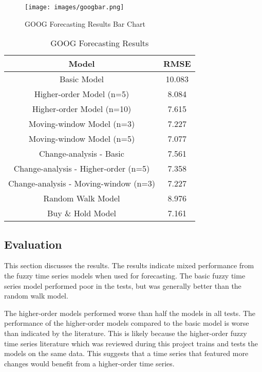 \documentclass[12pt, oneside, a4paper]{article}
\theoremstyle{definition}
\begin{document}
\begin{figure}[H]
    \centering
    \caption{GOOG Forecasting Results Bar Chart}
    \texttt{[image: images/googbar.png]}
    \label{googbar}
\end{figure}

\begin{table}[H]
	\center
	\begin{tabulary}{1.0\textwidth}{CC}
	\toprule[.15em]
	Model & RMSE \\
	\toprule[.15em]
	Basic Model & 10.083 \\
	\hline
	Higher-order Model (n=5) & 8.084\\
	\hline
	Higher-order Model (n=10) & 7.615\\
	\hline
	Moving-window Model (n=3) & 7.227\\
	\hline
	Moving-window Model (n=5) & 7.077\\
	\hline
	Change-analysis - Basic & 7.561\\
	\hline
	Change-analysis - Higher-order (n=5) & 7.358\\
	\hline
	Change-analysis - Moving-window (n=3) & 7.227\\
	\hline
	Random Walk Model & 8.976\\
	\hline
	Buy \& Hold Model & 7.161\\
  	\toprule[.15em]
	\end{tabulary}
	\caption{GOOG Forecasting Results}
	\label{googresults}
\end{table}

\newpage

\subsection{Evaluation}

This section discusses the results. The results indicate mixed performance from the fuzzy time series models when used for forecasting. The basic fuzzy time series model performed poor in the tests, but was generally better than the random walk model.

The higher-order models performed worse than half the models in all tests. The performance of the higher-order models compared to the basic model is worse than indicated by the literature. This is likely because the higher-order fuzzy time series literature which was reviewed during this project trains and tests the models on the same data. This suggests that a time series that featured more changes would benefit from a higher-order time series.
\end{document}
